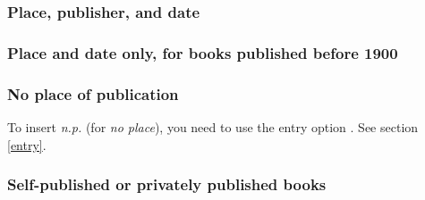 \documentclass[11pt,letterpaper,oneside]{article}
\begin{document}
\begin{citebib}
\item \cite{boxer1953}
\item \cite{palmatary1950}
\end{citebib}

\subsubsection{Place, publisher, and date}

\begin{citebib}
\item \cite{woolf1927}
\end{citebib}

\subsubsection{Place and date only, for books published before 1900}

\begin{citebib}
\item \cite{goldsmith1766}
\item \cite{cervantes1605}
\end{citebib}

\setcounter{subsubsection}{131}
\subsubsection{No place of publication}
\label{14.132}

To insert \textit{n.p.} (for \textit{no place}), you need to use the
entry option . See section \ref{entry}.

\begin{citenobib}
\item[] \cite{windsor1910}
\item[] \cite{vliet1890}
\end{citenobib}

\setcounter{subsubsection}{136}
\subsubsection{Self-published or privately published books}
\end{document}
